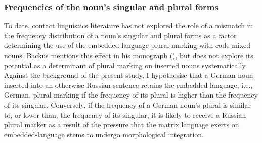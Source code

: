 \subsubsection{Frequencies of the noun's singular and plural forms}

To date, contact linguistics literature has not explored the role of a mismatch in the frequency distribution of a noun's singular and plural forms as a factor determining the use of the embedded-language plural marking with code-mixed nouns. Backus mentions this effect in his monograph (\citeyear{backus-two-1996}), but does not explore its potential as a determinant of plural marking on inserted nouns systematically. Against the background of the present study, I hypothesise that a German noun inserted into an otherwise Russian sentence retains the embedded-language, i.e., German, plural marking if the frequency of its plural is higher than the frequency of its singular. Conversely, if the frequency of a German noun’s plural is similar to, or lower than, the frequency of its singular, it is likely to receive a Russian plural marker as a result of the pressure that the matrix language exerts on embedded-language stems to undergo morphological integration. 

